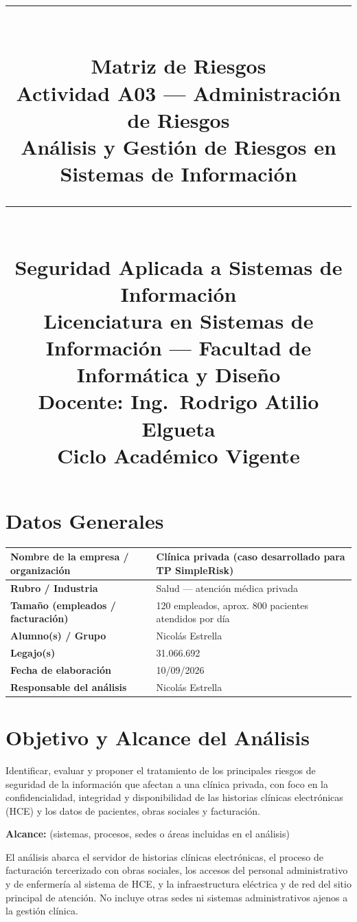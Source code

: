\documentclass[11pt,a4paper]{article}
\title{%
  \rule{\textwidth}{1pt}\\[0.4cm]
  \textbf{\Large Matriz de Riesgos}\\[0.2cm]
  \large Actividad A03 --- Administración de Riesgos\\[0.1cm]
  \normalsize Análisis y Gestión de Riesgos en Sistemas de Información\\[0.2cm]
  \rule{\textwidth}{1pt}\\[0.4cm]
  \normalsize Seguridad Aplicada a Sistemas de Información\\
  Licenciatura en Sistemas de Información --- Facultad de Informática y Diseño\\
  Docente: Ing.\ Rodrigo Atilio Elgueta\\[0.2cm]
  \small Ciclo Académico Vigente
}
\author{}
\date{}
\begin{document}
\maketitle
\thispagestyle{fancy}
\tableofcontents
\newpage

\section{Datos Generales}\label{sec:datos}

\begin{center}
\renewcommand{\arraystretch}{1.6}
\begin{tabularx}{\textwidth}{@{} p{5cm} X @{}}
\toprule
\textbf{Nombre de la empresa / organización} & Clínica privada (caso desarrollado para TP SimpleRisk) \\
\midrule
\textbf{Rubro / Industria} & Salud --- atención médica privada \\
\midrule
\textbf{Tamaño (empleados / facturación)} & 120 empleados, aprox. 800 pacientes atendidos por día \\
\midrule
\textbf{Alumno(s) / Grupo} & Nicolás Estrella \\
\midrule
\textbf{Legajo(s)} & 31.066.692 \\
\midrule
\textbf{Fecha de elaboración} & 10/09/2026 \\
\midrule
\textbf{Responsable del análisis} & Nicolás Estrella \\
\bottomrule
\end{tabularx}
\end{center}

\section{Objetivo y Alcance del Análisis}

\begin{campolibre}[2.5cm]
Identificar, evaluar y proponer el tratamiento de los principales riesgos de seguridad de la
información que afectan a una clínica privada, con foco en la confidencialidad, integridad y
disponibilidad de las historias clínicas electrónicas (HCE) y los datos de pacientes, obras
sociales y facturación.
\end{campolibre}

\textbf{Alcance:} (sistemas, procesos, sedes o áreas incluidas en el análisis)

\begin{campolibre}[2cm]
El análisis abarca el servidor de historias clínicas electrónicas, el proceso de facturación
tercerizado con obras sociales, los accesos del personal administrativo y de enfermería al
sistema de HCE, y la infraestructura eléctrica y de red del sitio principal de atención.
No incluye otras sedes ni sistemas administrativos ajenos a la gestión clínica.
\end{campolibre}
\end{document}
